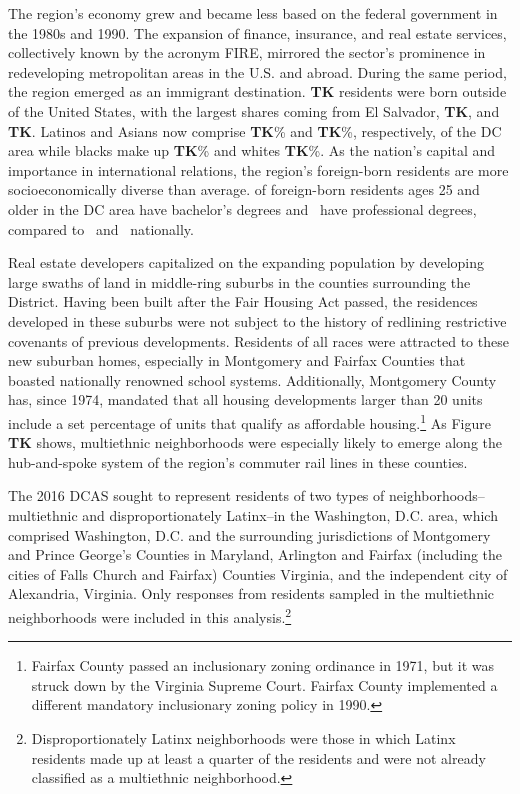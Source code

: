 \documentclass{baderart}
\newcommand{\TK}[1][]{\strong{TK #1}}
\begin{document}
The region's economy grew and became less based on the federal government in the 1980s and 1990. The expansion of finance, insurance, and real estate services, collectively known by the acronym FIRE, mirrored the sector's prominence in redeveloping metropolitan areas in the U.S. and abroad. During the same period, the region emerged as an immigrant destination. \textbf{TK} residents were born outside of the United States, with the largest shares coming from El Salvador, \textbf{TK}, and \textbf{TK}. Latinos and Asians now comprise \textbf{TK}\% and \textbf{TK}\%, respectively, of the DC area while blacks make up \textbf{TK}\% and whites \textbf{TK}\%. As the nation's capital and importance in international relations, the region's foreign-born residents are more socioeconomically diverse than average. \TK[\%] of foreign-born residents ages 25 and older in the DC area have bachelor's degrees and \TK[\%]\ have professional degrees, compared to \TK[\%]\ and \TK[\%]\ nationally. 



Real estate developers capitalized on the expanding population by developing large swaths of land in middle-ring suburbs in the counties surrounding the District. Having been built after the Fair Housing Act passed, the residences developed in these suburbs were not subject to the history of redlining restrictive covenants of previous developments. Residents of all races were attracted to these new suburban homes, especially in Montgomery and Fairfax Counties that boasted nationally renowned school systems. Additionally, Montgomery County has, since 1974, mandated that all housing developments larger than 20 units include a set percentage of units that qualify as affordable housing.\footnote{Fairfax County passed an inclusionary   zoning ordinance in 1971, but it was struck down by the Virginia   Supreme Court. Fairfax County implemented a different mandatory   inclusionary zoning policy in 1990.} As Figure \textbf{TK} shows, multiethnic neighborhoods were especially likely to emerge along the hub-and-spoke system of the region's commuter rail lines in these counties.


The 2016 DCAS sought to represent residents of two types of neighborhoods--multiethnic and disproportionately Latinx--in the Washington, D.C. area, which comprised Washington, D.C. and the surrounding jurisdictions of Montgomery and Prince George's Counties in Maryland, Arlington and Fairfax (including the cities of Falls Church and Fairfax) Counties Virginia, and the independent city of Alexandria, Virginia. Only responses from residents sampled in the multiethnic neighborhoods were included in this analysis.\footnote{Disproportionately   Latinx neighborhoods were those in which Latinx residents made up at   least a quarter of the residents and were not already classified as a   multiethnic neighborhood.}
\end{document}
